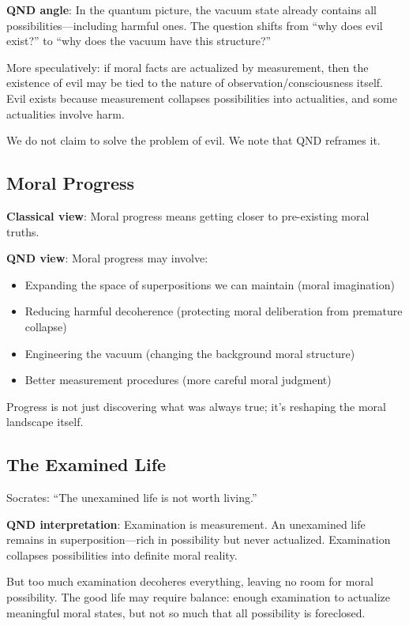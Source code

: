 \documentclass[12pt]{article}
\begin{document}
\textbf{QND angle}: In the quantum picture, the vacuum state already contains all possibilities---including harmful ones. The question shifts from ``why does evil exist?'' to ``why does the vacuum have this structure?''

More speculatively: if moral facts are actualized by measurement, then the existence of evil may be tied to the nature of observation/consciousness itself. Evil exists because measurement collapses possibilities into actualities, and some actualities involve harm.

We do not claim to solve the problem of evil. We note that QND reframes it.

\subsection{Moral Progress}

\textbf{Classical view}: Moral progress means getting closer to pre-existing moral truths.

\textbf{QND view}: Moral progress may involve:
\begin{itemize}
    \item Expanding the space of superpositions we can maintain (moral imagination)
    \item Reducing harmful decoherence (protecting moral deliberation from premature collapse)
    \item Engineering the vacuum (changing the background moral structure)
    \item Better measurement procedures (more careful moral judgment)
\end{itemize}

Progress is not just discovering what was always true; it's reshaping the moral landscape itself.

\subsection{The Examined Life}

Socrates: ``The unexamined life is not worth living.''

\textbf{QND interpretation}: Examination is measurement. An unexamined life remains in superposition---rich in possibility but never actualized. Examination collapses possibilities into definite moral reality.

But too much examination decoheres everything, leaving no room for moral possibility. The good life may require balance: enough examination to actualize meaningful moral states, but not so much that all possibility is foreclosed.
\end{document}
